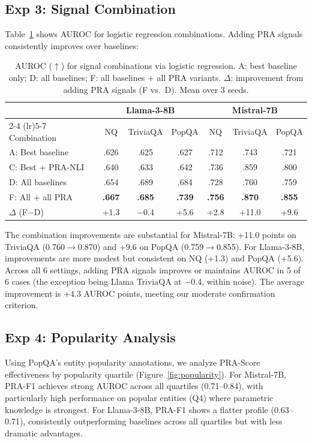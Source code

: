 \documentclass{article}
\begin{document}
\subsection{Exp 3: Signal Combination}

Table~\ref{tab:combination} shows AUROC for logistic regression combinations. Adding PRA signals consistently improves over baselines:

\begin{table}[t]
\caption{AUROC ($\uparrow$) for signal combinations via logistic regression. A: best baseline only; D: all baselines; F: all baselines + all PRA variants. $\Delta$: improvement from adding PRA signals (F vs.\ D). Mean over 3 seeds.}
\label{tab:combination}
\centering
\small
\begin{tabular}{lcccccc}
\toprule
& \multicolumn{3}{c}{Llama-3-8B} & \multicolumn{3}{c}{Mistral-7B} \\
\cmidrule(lr){2-4} \cmidrule(lr){5-7}
Combination & NQ & TriviaQA & PopQA & NQ & TriviaQA & PopQA \\
\midrule
A: Best baseline & .626 & .625 & .627 & .712 & .743 & .721 \\
C: Best + PRA-NLI & .640 & .633 & .642 & .736 & .859 & .800 \\
D: All baselines & .654 & .689 & .684 & .728 & .760 & .759 \\
F: All + all PRA & \textbf{.667} & \textbf{.685} & \textbf{.739} & \textbf{.756} & \textbf{.870} & \textbf{.855} \\
\midrule
$\Delta$ (F$-$D) & +1.3 & $-$0.4 & +5.6 & +2.8 & +11.0 & +9.6 \\
\bottomrule
\end{tabular}
\end{table}

The combination improvements are substantial for Mistral-7B: +11.0 points on TriviaQA (0.760$\to$0.870) and +9.6 on PopQA (0.759$\to$0.855). For Llama-3-8B, improvements are more modest but consistent on NQ (+1.3) and PopQA (+5.6). Across all 6 settings, adding PRA signals improves or maintains AUROC in 5 of 6 cases (the exception being Llama TriviaQA at $-$0.4, within noise). The average improvement is +4.3 AUROC points, meeting our moderate confirmation criterion.

\subsection{Exp 4: Popularity Analysis}

Using PopQA's entity popularity annotations, we analyze PRA-Score effectiveness by popularity quartile (Figure~\ref{fig:popularity}). For Mistral-7B, PRA-F1 achieves strong AUROC across all quartiles (0.71--0.84), with particularly high performance on popular entities (Q4) where parametric knowledge is strongest. For Llama-3-8B, PRA-F1 shows a flatter profile (0.63--0.71), consistently outperforming baselines across all quartiles but with less dramatic advantages.
\end{document}

